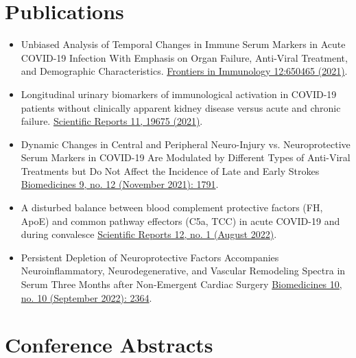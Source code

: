 \documentclass[letterpaper,11pt]{article}
\newcommand{\reusmeSubHeadingListSmallStart}{\begin{itemize}[itemsep=-4pt, parsep=4pt]}
\newcommand{\resumeSubHeadingListSmallEnd}{\end{itemize}}
\begin{document}

\section{Publications}

\reusmeSubHeadingListSmallStart
\item\small {
    Unbiased Analysis of Temporal Changes in Immune Serum Markers in Acute
    COVID-19 Infection With Emphasis on Organ Failure, Anti-Viral Treatment,
    and Demographic Characteristics.
    \href{https://www.frontiersin.org/articles/10.3389/fimmu.2021.650465/full}
    {Frontiers in Immunology 12:650465 (2021)}.
}

\item\small {
    Longitudinal urinary biomarkers of immunological activation in COVID-19
    patients without clinically apparent kidney disease versus acute and
    chronic failure.
    \href{https://www.nature.com/articles/s41598-021-99102-5.pdf?proof=tr}
    {Scientific Reports 11, 19675 (2021)}.
}

\item\small {
    Dynamic Changes in Central and Peripheral Neuro-Injury vs. Neuroprotective Serum
    Markers in COVID-19 Are Modulated by Different Types of Anti-Viral Treatments but
    Do Not Affect the Incidence of Late and Early Strokes
    \href{https://doi.org/10.3390/biomedicines9121791}
    {Biomedicines 9, no. 12 (November 2021): 1791}.
}

\item\small {
    A disturbed balance between blood complement protective factors (FH, ApoE) and
    common pathway effectors (C5a, TCC) in acute COVID-19 and during convalesce
    \href{https://doi.org/10.1038/s41598-022-17011-7}
    {Scientific Reports 12, no. 1 (August 2022)}.
}

\item\small {
    Persistent Depletion of Neuroprotective Factors Accompanies Neuroinflammatory,
    Neurodegenerative, and Vascular Remodeling Spectra in Serum Three Months after
    Non-Emergent Cardiac Surgery
    \href{https://doi.org/10.3390/biomedicines10102364}
    {Biomedicines 10, no. 10 (September 2022): 2364}.
}

\resumeSubHeadingListSmallEnd

\vspace{-20pt}

\section{Conference Abstracts}
\end{document}
